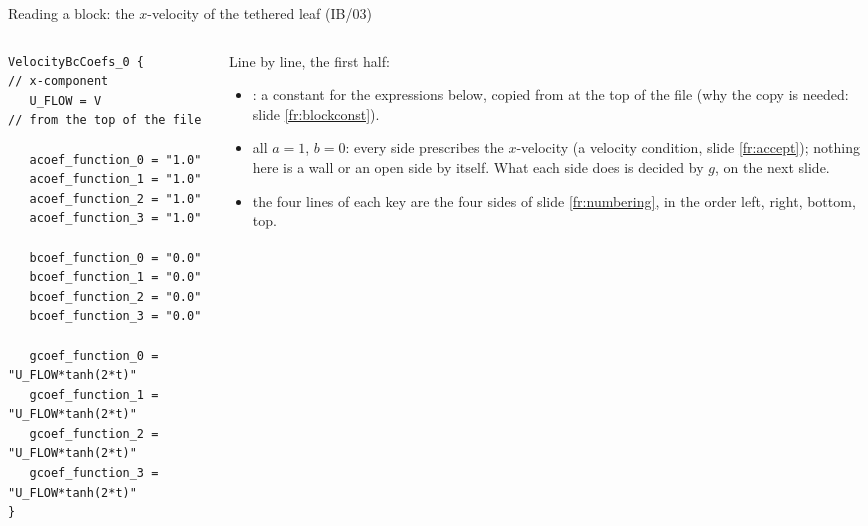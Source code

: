 \documentclass[aspectratio=169,11pt]{beamer}
\begin{document}
\begin{frame}[fragile]{Reading a block: the $x$-velocity of the tethered leaf (IB/03)}
\label{fr:readblock}
\begin{columns}[T,onlytextwidth]
\begin{column}{0.5\textwidth}
\begin{lstlisting}[style=inputtiny]
VelocityBcCoefs_0 {       // x-component
   U_FLOW = V             // from the top of the file

   acoef_function_0 = "1.0"
   acoef_function_1 = "1.0"
   acoef_function_2 = "1.0"
   acoef_function_3 = "1.0"

   bcoef_function_0 = "0.0"
   bcoef_function_1 = "0.0"
   bcoef_function_2 = "0.0"
   bcoef_function_3 = "0.0"

   gcoef_function_0 = "U_FLOW*tanh(2*t)"
   gcoef_function_1 = "U_FLOW*tanh(2*t)"
   gcoef_function_2 = "U_FLOW*tanh(2*t)"
   gcoef_function_3 = "U_FLOW*tanh(2*t)"
}
\end{lstlisting}
\end{column}
\begin{column}{0.48\textwidth}
\small Line by line, the first half:
\begin{itemize}
  \item {}: a constant for the expressions below, copied from  at the top of the file (why the copy is needed: slide \ref{fr:blockconst}).
  \item all $a = 1$, $b = 0$: every side prescribes the $x$-velocity (a velocity condition, slide \ref{fr:accept}); nothing here is a wall or an open side by itself. What each side does is decided by $g$, on the next slide.
  \item the four lines of each key are the four sides of slide \ref{fr:numbering}, in the order left, right, bottom, top.
\end{itemize}
\end{column}
\end{columns}
\end{frame}
\end{document}
